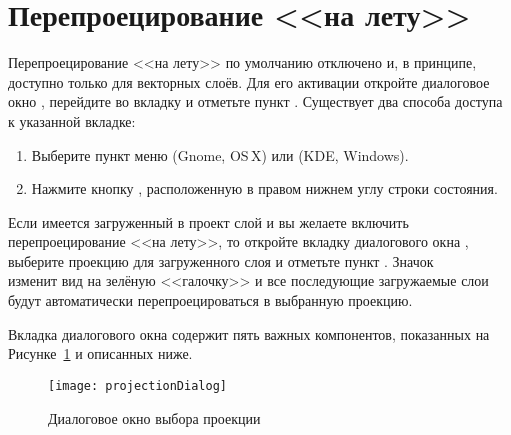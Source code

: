 \section{Перепроецирование <<на лету>>}\label{label_projstart}

Перепроецирование <<на лету>> по умолчанию отключено и, в принципе, доступно
только для векторных слоёв. Для его активации откройте диалоговое окно
, перейдите во вкладку
 и отметьте пункт
. Существует два
способа доступа к указанной вкладке:

\begin{enumerate}
\item Выберите пункт  меню
 (Gnome, OS\,X) или  (KDE,
Windows).
\item Нажмите кнопку , расположенную в правом нижнем углу строки состояния.
\end{enumerate}

Если имеется загруженный в проект слой и вы желаете включить перепроецирование
<<на лету>>, то откройте вкладку  диалогового окна
, выберите проекцию для загруженного слоя и
отметьте пункт
. Значок \\
 изменит вид
на зелёную <<галочку>> и все последующие загружаемые слои будут автоматически
перепроецироваться в выбранную проекцию.

Вкладка  диалогового окна 
содержит пять важных компонентов, показанных на Рисунке~\ref{fig:projections} и
описанных ниже.

\begin{figure}[ht]
   \centering
   \texttt{[image: projectionDialog]}
   \caption{Диалоговое окно выбора проекции \wincaption}\label{fig:projections}
\end{figure}

